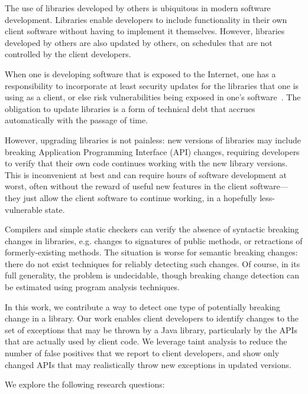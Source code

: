 The use of libraries developed by others is ubiquitous in modern
software development. Libraries enable developers to include
functionality in their own client software without having to
implement it themselves.  However, libraries developed by others are
also updated by others, on schedules that are not controlled by the client developers.

When one is developing software that is exposed to the Internet, one
has a responsibility to incorporate at least security updates for the
libraries that one is using as a client, or else risk vulnerabilities
being exposed in one's software~\cite{haryono22:_autom_ident_librar_vulner_data}. The obligation to update libraries is
a form of technical debt that accrues automatically with the passage
of time.

However, upgrading libraries is not painless: new
versions of libraries may include breaking Application Programming
Interface (API) changes, requiring developers to verify that their own
code continues working with the new library versions. This is
inconvenient at best and can require hours of software development at worst,
often without the reward of useful new features in the client software---they
just allow the client software to continue working, in a hopefully less-vulnerable
state.

Compilers and simple static checkers can verify the absence of
syntactic breaking changes in libraries, e.g. changes to signatures of
public methods, or retractions of formerly-existing methods. The
situation is worse for semantic breaking changes: there do not exist
techniques for reliably detecting such changes. Of course, in its full
generality, the problem is undecidable, though breaking change
detection can be estimated using program analysis techniques.


In this work, we contribute a way to detect one type of potentially breaking
change in a library. Our work enables client developers to identify changes
to the set of exceptions that may be thrown by a Java library, particularly
by the APIs that are actually used by client code. We leverage taint analysis
to reduce the number of false positives that we report to client developers,
and show only changed APIs that may realistically throw new exceptions
in updated versions. %

We explore the following research questions:

